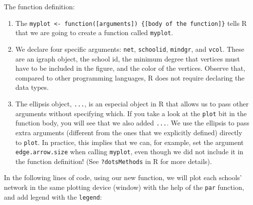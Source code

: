 \documentclass[]{book}
\begin{document}
The function definition:

\begin{enumerate}
\def\labelenumi{\arabic{enumi}.}
\item
  The \texttt{myplot\ \textless{}-\ function({[}arguments{]})\ \{{[}body\ of\ the\ function{]}\}} tells R that we are going to create a function called \texttt{myplot}.
\item
  We declare four specific arguments: \texttt{net}, \texttt{schoolid}, \texttt{mindgr}, and \texttt{vcol}. These are an igraph object, the school id, the minimum degree that vertices must have to be included in the figure, and the color of the vertices. Observe that, compared to other programming languages, R does not require declaring the data types.
\item
  The ellipsis object, \texttt{...}, is an especial object in R that allows us to pass other arguments without specifying which. If you take a look at the \texttt{plot} bit in the function body, you will see that we also added \texttt{...}. We use the ellipsis to pass extra arguments (different from the ones that we explicitly defined) directly to \texttt{plot}. In practice, this implies that we can, for example, set the argument \texttt{edge.arrow.size} when calling \texttt{myplot}, even though we did not include it in the function definition! (See \texttt{?dotsMethods} in R for more details).
\end{enumerate}

In the following lines of code, using our new function, we will plot each schools' network in the same plotting device (window) with the help of the \texttt{par} function, and add legend with the \texttt{legend}:
\end{document}
